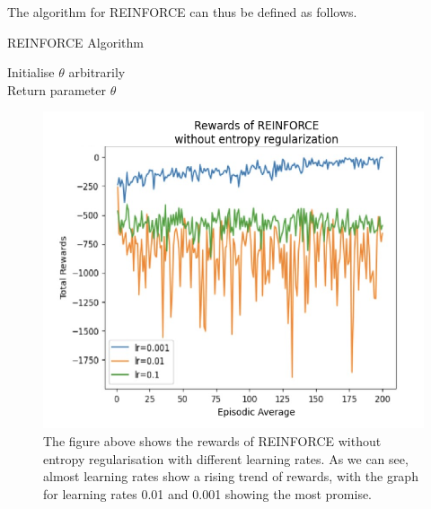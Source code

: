 \documentclass{article}
\begin{document}
The algorithm for REINFORCE can thus be defined as follows. 
\begin{algorithm}[htbp]
\caption{REINFORCE Algorithm}
\SetAlgoLined
\DontPrintSemicolon
\small %
Initialise $\theta$ arbitrarily\;\\
Return parameter $\theta$
\end{algorithm}

\begin{figure}[h!]
\centering
\includegraphics[width=0.9\linewidth]{Report/images/02.Rewards_of_REINFORCE_without_ER.png}
\caption{\label{fig:Reinforce Rewards}The figure above shows the rewards of REINFORCE without entropy regularisation with different learning rates. As we can see, almost learning rates show a rising trend of rewards, with the graph for learning rates 0.01 and 0.001 showing the most promise. }
\end{figure}
\end{document}
